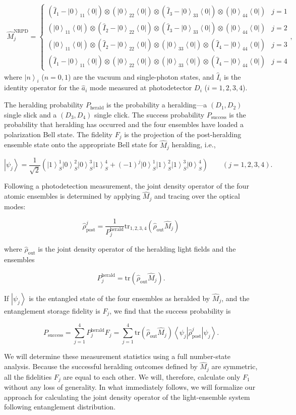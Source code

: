 \documentclass[aps,twocolumn,secnumarabic,amsmath,amssymb,pra,groupedaddress,
showpacs, showkeys]{revtex4-1}
\newcommand{\bra}[1]{\left\langle #1 \right|}
\newcommand{\ket}[1]{\left|#1\right\rangle}
\newcommand{\pna}[1]{\left(#1\right)}
\newcommand{\eqn}[1]{
\begin{equation}
	#1
\end{equation}
}
\begin{document}
\begin{align}
    \hat{M}_j^{\textrm{NRPD}} = \left\{
	\begin{array}{lr}
\pna{\hat{I}_1-\ket{0}_{11}\bra{0}}\otimes\pna{\ket{0}_{22}\bra{0}}\otimes\pna{\hat{I}_3-\ket{0}_{33}\bra{0}}\otimes\pna{\ket{0}_{44}\bra{0}} & j=1\\
\pna{\ket{0}_{11}\bra{0}}\otimes\pna{\hat{I}_2-\ket{0}_{22}\bra{0}}\otimes\pna{\hat{I}_3-\ket{0}_{33}\bra{0}}\otimes\pna{\ket{0}_{44}\bra{0}} & j=2\\
\pna{\ket{0}_{11}\bra{0}}\otimes\pna{\hat{I}_2-\ket{0}_{22}\bra{0}}\otimes\pna{\ket{0}_{33}\bra{0}}\otimes\pna{\hat{I}_4-\ket{0}_{44}\bra{0}} & j=3\\
\pna{\hat{I}_1-\ket{0}_{11}\bra{0}}\otimes\pna{\ket{0}_{22}\bra{0}}\otimes\pna{\ket{0}_{33}\bra{0}}\otimes\pna{\hat{I}_4-\ket{0}_{44}\bra{0}} & j=4
	\end{array}
	\right.,
	\label{eq:chap3:meas_povm}
\end{align}
where $\ket{n}_i$ ($n=0,1$) are the vacuum and single-photon states, and
$\hat{I}_i$ is the identity operator for the $\hat{a}_i$ mode measured at
photodetector $D_i$ ($i=1,2,3,4$).

The heralding probability $P_{\textrm{herald}}$ is the probability a
heralding---a $\pna{D_1, D_2}$ single slick and a $\pna{D_3, D_4}$ single
click. The success probability $P_{\textrm{success}}$ is the probability that
heralding has occurred and the four ensembles have loaded a polarization Bell
state. The fidelity $F_j$ is the projection of the post-heralding ensemble
state onto the appropriate Bell state for $\hat{M}_j$ heralding, i.e.,
\eqn{
\ket{\psi_j} = \frac{1}{\sqrt{2}}\pna{\ket{1}_S^1\ket{0}_S^2\ket{0}_S^3\ket{1}_S^4+\pna{-1}^j \ket{0}_S^1\ket{1}_S^2\ket{1}_S^3\ket{0}_S^4} \qquad \pna{j=1,2,3,4}.\label{eqn:remaining_singlet}
}
Following a photodetection measurement, the joint density operator of the four
atomic ensembles is determined by applying $\hat{M}_j$ and tracing over the
optical modes:
	\eqn{
	\hat{\rho}_{\textrm{post}}^j=\frac{1}{P_j^{\textrm{herald}}}\textrm{tr}_{1,2,3,4}\pna{\hat{\rho}_{\textrm{out}}\hat{M}_j}
	}
	where $\hat{\rho}_{\textrm{out}}$ is the joint density operator of the heralding light fields and the ensembles 
	\eqn{
	P_j^{\textrm{herald}}=\textrm{tr}\pna{\hat{\rho}_{\textrm{out}}\hat{M}_j} \label{eqn:herald_prob}.
}
If $\ket{\psi_j}$ is the entangled state of the four ensembles as heralded by
$\hat{M}_j$, and the entanglement storage fidelity is $F_j$, we find that the
success probability is
\eqn{
P_{\textrm{success}} = \sum_{j=1}^4 P_j^{\textrm{herald}} F_j =\sum_{j=1}^{4} \textrm{tr}\pna{\hat{\rho}_{\textrm{out}}\hat{M}_j} \bra{\psi_j} \hat{\rho}_{\textrm{post}}^j \ket{\psi_j}.\label{eq:success_prob_def}  
}
We will determine these measurement statistics using a full number-state
analysis. Because the successful heralding outcomes defined by $\hat{M}_j$ are
symmetric, all the fidelities $F_j$ are equal to each other. We will,
therefore, calculate only $F_1$ without any loss of generality.  In what
immediately follows, we will formalize our approach for calculating the joint
density operator of the light-ensemble system following entanglement
distribution.
\end{document}
